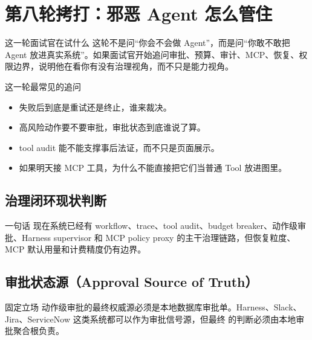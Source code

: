 \documentclass[12pt]{article}
\begin{document}
\section{第八轮拷打：邪恶 Agent 怎么管住}

\begin{summaryBox}{这一轮面试官在试什么}
这轮不是问“你会不会做 Agent”，而是问“你敢不敢把 Agent 放进真实系统”。如果面试官开始追问审批、预算、审计、MCP、恢复、权限边界，说明他在看你有没有治理视角，而不只是能力视角。
\end{summaryBox}

\begin{qaBox}{这一轮最常见的追问}
\begin{itemize}[leftmargin=2em]
  \item 失败后到底是重试还是终止，谁来裁决。
  \item 高风险动作要不要审批，审批状态到底谁说了算。
  \item tool audit 能不能支撑事后法证，而不只是页面展示。
  \item 如果明天接 MCP 工具，为什么不能直接把它们当普通 Tool 放进图里。
\end{itemize}
\end{qaBox}

\subsection{治理闭环现状判断}
\begin{summaryBox}{一句话}
现在系统已经有 workflow、trace、tool audit、budget breaker、动作级审批、Harness supervisor 和 MCP policy proxy 的主干治理链路，但恢复粒度、MCP 默认用量和计费精度仍有边界。
\end{summaryBox}

\subsection{审批状态源（Approval Source of Truth）}
\begin{center}

\end{center}

\begin{qaBox}{固定立场}
动作级审批的最终权威源必须是本地数据库审批单。Harness、Slack、Jira、ServiceNow 这类系统都可以作为审批信号源，但最终  的判断必须由本地审批聚合根负责。
\end{qaBox}
\end{document}
